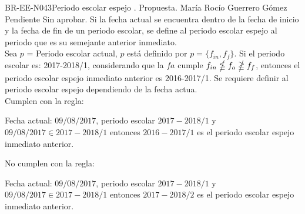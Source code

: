 \begin{BusinessRule}{BR-EE-N043}{Periodo escolar espejo}
	{\bcIntegridad}    %
	{\btEnabler}     %
	{\blControlling}    %
	.
	\BRItem[Estado] Propuesta.
	 María Rocío Guerrero Gómez
	 Pendiente
	 Sin aprobar.
	\BRItem[Descripción] Si la fecha actual se encuentra dentro de la fecha de inicio y la fecha de fin de un periodo escolar, se define al periodo escolar espejo al periodo que es su semejante anterior inmediato.\\
	\BRItem[Sentencia] Sea $p$ = Periodo escolar actual, $p$ está definido por $p = \{f_{in},f_{f}\}$. 
	Si el periodo escolar es: 2017-2018/1, considerando que la $fa$ cumple $f_{in} \nleqq f_{a} \ngeqq f_{f}$, entonces el periodo escolar espejo inmediato anterior es 2016-2017/1.
	\BRItem[Motivación] Se requiere definir al periodo escolar espejo dependiendo de la fecha actua.\\
	 Cumplen con la regla: \\
	\begin{Titemize}
		\Titem Fecha actual: $09/08/2017$, periodo escolar $2017-2018/1$ y $09/08/2017 \in 2017-2018/1$ entonces $2016-2017/1$ es el periodo escolar espejo inmediato anterior.
	\end{Titemize}	
	 No cumplen con la regla: \\
	\begin{Titemize}
		\Titem Fecha actual: $09/08/2017$, periodo escolar $2017-2018/1$ y $09/08/2017 \in 2017-2018/1$ entonces $2017-2018/2$ es el periodo escolar espejo inmediato anterior.
	\end{Titemize}	
\end{BusinessRule}

